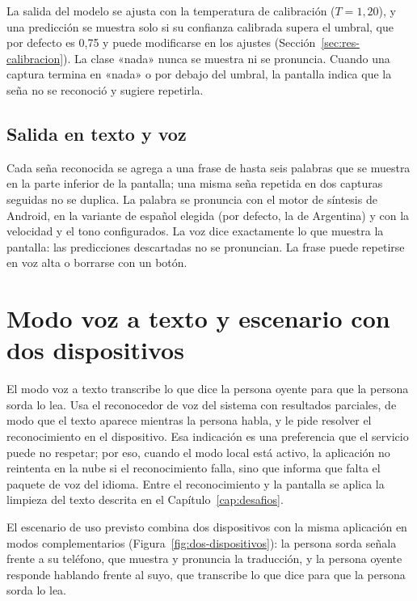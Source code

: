 La salida del modelo se ajusta con la temperatura de calibración ($T = 1{,}20$), y una predicción se muestra solo si su confianza calibrada supera el umbral, que por defecto es 0,75 y puede modificarse en los ajustes (Sección~\ref{sec:res-calibracion}). La clase «nada» nunca se muestra ni se pronuncia. Cuando una captura termina en «nada» o por debajo del umbral, la pantalla indica que la seña no se reconoció y sugiere repetirla.

\subsection{Salida en texto y voz}

Cada seña reconocida se agrega a una frase de hasta seis palabras que se muestra en la parte inferior de la pantalla; una misma seña repetida en dos capturas seguidas no se duplica. La palabra se pronuncia con el motor de síntesis de Android, en la variante de español elegida (por defecto, la de Argentina) y con la velocidad y el tono configurados. La voz dice exactamente lo que muestra la pantalla: las predicciones descartadas no se pronuncian. La frase puede repetirse en voz alta o borrarse con un botón.

\section{Modo voz a texto y escenario con dos dispositivos}

El modo voz a texto transcribe lo que dice la persona oyente para que la persona sorda lo lea. Usa el reconocedor de voz del sistema con resultados parciales, de modo que el texto aparece mientras la persona habla, y le pide resolver el reconocimiento en el dispositivo. Esa indicación es una preferencia que el servicio puede no respetar; por eso, cuando el modo local está activo, la aplicación no reintenta en la nube si el reconocimiento falla, sino que informa que falta el paquete de voz del idioma. Entre el reconocimiento y la pantalla se aplica la limpieza del texto descrita en el Capítulo~\ref{cap:desafios}.

El escenario de uso previsto combina dos dispositivos con la misma aplicación en modos complementarios (Figura~\ref{fig:dos-dispositivos}): la persona sorda señala frente a su teléfono, que muestra y pronuncia la traducción, y la persona oyente responde hablando frente al suyo, que transcribe lo que dice para que la persona sorda lo lea.

